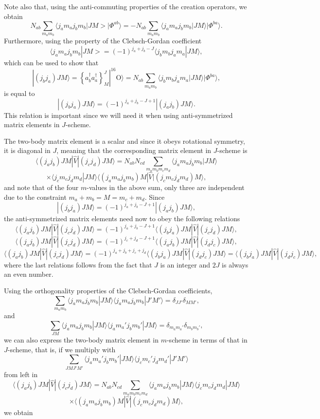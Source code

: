 \documentclass[graybox,sectrefs,envcountresetchap,open=right]{svmonodo}
\begin{document}
Note also that, using the anti-commuting properties of the creation operators, we obtain
\[
N_{ab}\sum_{m_am_b}\langle j_am_aj_bm_b|JM>|\Phi^{ab}\rangle=-N_{ab}\sum_{m_am_b}\langle j_am_aj_bm_b|JM\rangle|\Phi^{ba}\rangle.
\]
Furthermore, using the property of the Clebsch-Gordan coefficient
\[
\langle j_am_aj_bm_b|JM>=(-1)^{j_a+j_b-J}\langle j_bm_bj_am_a|JM\rangle,
\]
which can be used to show that
\[
|(j_bj_a)JM\rangle  = \left\{a^{\dagger}_ba^{\dagger}_a\right\}^J_M|^{16}\mathrm{O}\rangle=N_{ab}\sum_{m_am_b}\langle j_bm_bj_am_a|JM\rangle|\Phi^{ba}\rangle, 
\]
is equal to 
\[
|(j_bj_a)JM\rangle=(-1)^{j_a+j_b-J+1}|(j_aj_b)JM\rangle.
\]
This relation is important since we will need it when using anti-symmetrized matrix elements in $J$-scheme.



The two-body matrix element is a scalar and since it obeys rotational symmetry, it is diagonal in $J$, 
meaning that the corresponding matrix element in $J$-scheme is 
\[
\langle (j_aj_b) JM | \hat{V} | (j_cj_d) JM \rangle = N_{ab}N_{cd}\sum_{m_am_b m_cm_d}\langle j_am_aj_bm_b|JM\rangle
\]
\[\times \langle j_cm_cj_dm_d|JM\rangle\langle (j_am_aj_bm_b)M |  \hat{V} | (j_cm_cj_dm_d)M \rangle,
\]
and note that of the four $m$-values in the above sum, only three are independent due to the constraint $m_a+m_b=M=m_c+m_d$.
Since
\[
|(j_bj_a)JM\rangle=(-1)^{j_a+j_b-J+1}|(j_aj_b)JM\rangle,
\]
the anti-symmetrized matrix elements need now to obey the following relations
\[
\langle (j_aj_b) JM | \hat{V} | (j_cj_d) JM \rangle = (-1)^{j_a+j_b-J+1}\langle (j_bj_a) JM | \hat{V} | (j_cj_d) JM \rangle,
\]
\[
\langle (j_aj_b) JM | \hat{V} | (j_cj_d) JM \rangle = (-1)^{j_c+j_d-J+1}\langle (j_aj_b) JM | \hat{V} | (j_dj_c) JM \rangle,
\]
\[
\langle (j_aj_b) JM | \hat{V} | (j_cj_d) JM \rangle = (-1)^{j_a+j_b+j_c+j_d}\langle (j_bj_a) JM | \hat{V} | (j_dj_c) JM \rangle=\langle (j_bj_a) JM | \hat{V} | (j_dj_c) JM \rangle,
\]
where the last relations follows from the fact that $J$ is an integer and $2J$ is always an even number.




Using the orthogonality properties of the Clebsch-Gordan coefficients,
\[
\sum_{m_am_b}\langle j_am_aj_bm_b|JM\rangle\langle j_am_aj_bm_b|J'M'\rangle=\delta_{JJ'}\delta_{MM'},
\]
and
\[
\sum_{JM}\langle j_am_aj_bm_b|JM\rangle\langle j_am_a'j_bm_b'|JM\rangle=\delta_{m_am_a'}\delta_{m_bm_b'},
\]
we can also express the two-body matrix element in $m$-scheme in terms of that in $J$-scheme, that is, if we multiply with 
\[
\sum_{JMJ'M'}\langle j_am_a'j_bm_b'|JM\rangle\langle j_cm_c'j_dm_d'|J'M'\rangle
\]
from left in
\[
\langle (j_a j_b) JM | \hat{V} | (j_c j_d) JM \rangle = N_{ab}N_{cd}\sum_{m_a m_b m_c m_d}\langle j_am_aj_bm_b|JM\rangle\langle j_cm_cj_dm_d|JM\rangle
\]
\[
\times \langle (j_am_aj_bm_b)M|  \hat{V} | (j_cm_cj_dm_d)M\rangle,
\]
we obtain
\end{document}
